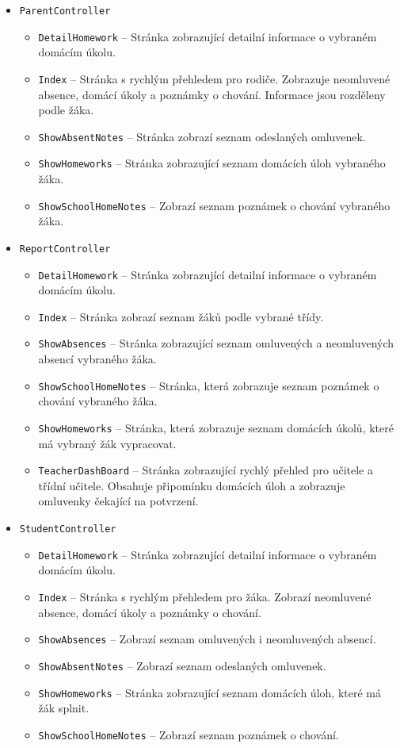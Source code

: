 \begin{itemize}
    \item \texttt{ParentController}
    \begin{itemize}
        \item \texttt{DetailHomework} -- Stránka zobrazující detailní informace o vybraném domácím úkolu.
        \item \texttt{Index} -- Stránka s rychlým přehledem pro rodiče. Zobrazuje neomluvené absence, domácí úkoly a poznámky o chování. Informace jsou rozděleny podle žáka.
        \item \texttt{ShowAbsentNotes} -- Stránka zobrazí seznam odeslaných omluvenek.
        \item \texttt{ShowHomeworks} -- Stránka zobrazující seznam domácích úloh vybraného žáka.
        \item \texttt{ShowSchoolHomeNotes} -- Zobrazí seznam poznámek o chování vybraného žáka.
    \end{itemize}
    
    \item \texttt{ReportController}
    \begin{itemize}
        \item \texttt{DetailHomework} -- Stránka zobrazující detailní informace o vybraném domácím úkolu.
        \item \texttt{Index} -- Stránka zobrazí seznam žáků podle vybrané třídy.
        \item \texttt{ShowAbsences} -- Stránka zobrazující seznam omluvených a neomluvených absencí vybraného žáka.
        \item \texttt{ShowSchoolHomeNotes} -- Stránka, která zobrazuje seznam poznámek o chování vybraného žáka.
        \item \texttt{ShowHomeworks} -- Stránka, která zobrazuje seznam domácích úkolů, které má vybraný žák vypracovat.
        \item \texttt{TeacherDashBoard} -- Stránka zobrazující rychlý přehled pro učitele a třídní učitele. Obsahuje připomínku domácích úloh a zobrazuje omluvenky čekající na potvrzení.
    \end{itemize}
    
    \item \texttt{StudentController}
    \begin{itemize}
        \item \texttt{DetailHomework} -- Stránka zobrazující detailní informace o vybraném domácím úkolu.
        \item \texttt{Index} -- Stránka s rychlým přehledem pro žáka. Zobrazí neomluvené absence, domácí úkoly a poznámky o chování.
        \item \texttt{ShowAbsences} -- Zobrazí seznam omluvených i neomluvených absencí.
        \item \texttt{ShowAbsentNotes} -- Zobrazí seznam odeslaných omluvenek.
        \item \texttt{ShowHomeworks} -- Stránka zobrazující seznam domácích úloh, které má žák splnit.
        \item \texttt{ShowSchoolHomeNotes} -- Zobrazí seznam poznámek o chování.
    \end{itemize}
\end{itemize}

